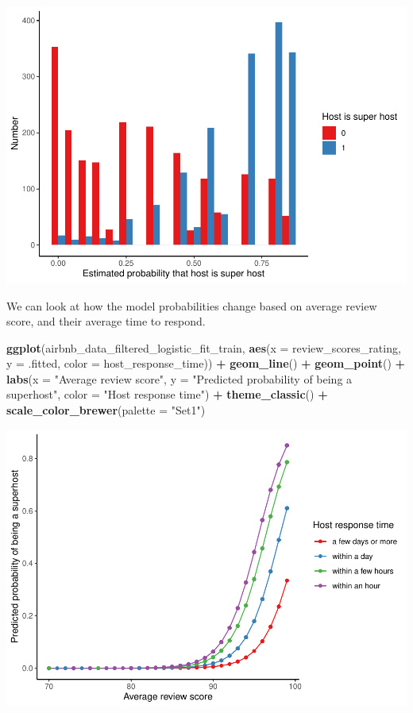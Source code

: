 \documentclass[
]{book}
\newenvironment{Shaded}{\begin{snugshade}}{\end{snugshade}}
\newcommand{\DataTypeTok}[1]{\textcolor[rgb]{0.13,0.29,0.53}{#1}}
\newcommand{\KeywordTok}[1]{\textcolor[rgb]{0.13,0.29,0.53}{\textbf{#1}}}
\newcommand{\NormalTok}[1]{#1}
\newcommand{\OperatorTok}[1]{\textcolor[rgb]{0.81,0.36,0.00}{\textbf{#1}}}
\newcommand{\StringTok}[1]{\textcolor[rgb]{0.31,0.60,0.02}{#1}}
\begin{document}
\includegraphics{telling_stories_with_data_files/figure-latex/unnamed-chunk-342-1.pdf}

We can look at how the model probabilities change based on average review score, and their average time to respond.

\begin{Shaded}
\begin{Highlighting}[]
\KeywordTok{ggplot}\NormalTok{(airbnb_data_filtered_logistic_fit_train, }
       \KeywordTok{aes}\NormalTok{(}\DataTypeTok{x =}\NormalTok{ review_scores_rating, }
           \DataTypeTok{y =}\NormalTok{ .fitted, }
           \DataTypeTok{color =}\NormalTok{ host_response_time)) }\OperatorTok{+}
\StringTok{  }\KeywordTok{geom_line}\NormalTok{() }\OperatorTok{+}
\StringTok{  }\KeywordTok{geom_point}\NormalTok{() }\OperatorTok{+}
\StringTok{  }\KeywordTok{labs}\NormalTok{(}\DataTypeTok{x =} \StringTok{"Average review score"}\NormalTok{,}
       \DataTypeTok{y =} \StringTok{"Predicted probability of being a superhost"}\NormalTok{,}
       \DataTypeTok{color =} \StringTok{"Host response time"}\NormalTok{) }\OperatorTok{+}
\StringTok{  }\KeywordTok{theme_classic}\NormalTok{() }\OperatorTok{+}
\StringTok{  }\KeywordTok{scale_color_brewer}\NormalTok{(}\DataTypeTok{palette =} \StringTok{"Set1"}\NormalTok{)}
\end{Highlighting}
\end{Shaded}

\includegraphics{telling_stories_with_data_files/figure-latex/unnamed-chunk-343-1.pdf}
\end{document}
